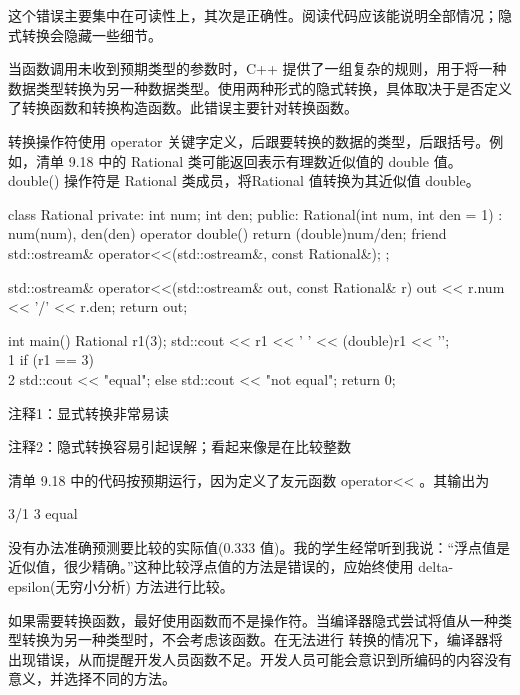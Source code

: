 这个错误主要集中在可读性上，其次是正确性。阅读代码应该能说明全部情况；隐式转换会隐藏一些细节。

当函数调用未收到预期类型的参数时，C++ 提供了一组复杂的规则，用于将一种数据类型转换为另一种数据类型。使用两种形式的隐式转换，具体取决于是否定义了转换函数和转换构造函数。此错误主要针对转换函数。


转换操作符使用 operator 关键字定义，后跟要转换的数据的类型，后跟括号。例如，清单 9.18 中的 Rational 类可能返回表示有理数近似值的 double 值。double() 操作符是 Rational 类成员，将Rational 值转换为其近似值 double。


\begin{cpp}
class Rational {
private:
  int num;
  int den;
public:
  Rational(int num, int den = 1) : num(num), den(den) {}
  operator double() { return (double)num/den; }
  friend std::ostream& operator<<(std::ostream&, const Rational&);
};

std::ostream& operator<<(std::ostream& out, const Rational& r) {
  out << r.num << '/' << r.den;
  return out;
}

int main() {
  Rational r1(3);
  std::cout << r1 << ' ' << (double)r1 << '\n'; \\ 1
  if (r1 == 3) \\ 2
    std::cout << "equal\n";
  else
    std::cout << "not equal\n";
  return 0;
}
\end{cpp}

{\footnotesize
注释1：显式转换非常易读

注释2：隐式转换容易引起误解；看起来像是在比较整数
}

清单 9.18 中的代码按预期运行，因为定义了友元函数 operator<{}< 。其输出为

\begin{shell}
3/1 3
equal
\end{shell}

没有办法准确预测要比较的实际值(0.333 值)。我的学生经常听到我说：“浮点值是近似值，很少精确。”这种比较浮点值的方法是错误的，应始终使用 delta-epsilon(无穷小分析) 方法进行比较。


如果需要转换函数，最好使用函数而不是操作符。当编译器隐式尝试将值从一种类型转换为另一种类型时，不会考虑该函数。在无法进行 转换的情况下，编译器将出现错误，从而提醒开发人员函数不足。开发人员可能会意识到所编码的内容没有意义，并选择不同的方法。

